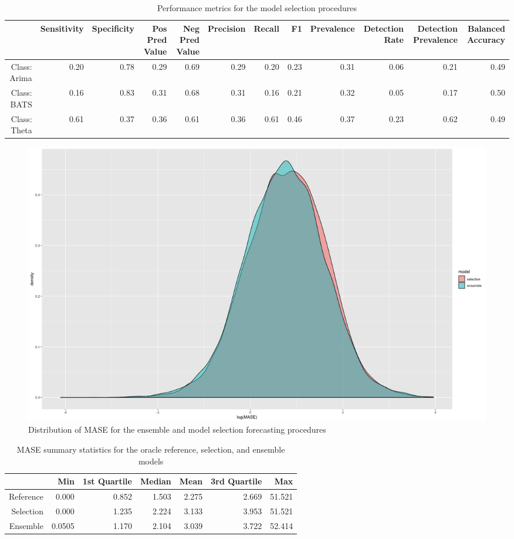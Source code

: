 \documentclass[11pt,3p,review,authoryear]{elsarticle}
\begin{document}
\begin{table}[ht]
\centering
\begin{adjustbox}{width=1\textwidth}
\begin{tabular}{rrrrrrrrrrrr}
  \hline
 & Sensitivity & Specificity & Pos Pred Value & Neg Pred Value & Precision & Recall & F1 & Prevalence & Detection Rate & Detection Prevalence & Balanced Accuracy \\ 
  \hline
Class: Arima & 0.20 & 0.78 & 0.29 & 0.69 & 0.29 & 0.20 & 0.23 & 0.31 & 0.06 & 0.21 & 0.49 \\ 
  Class: BATS & 0.16 & 0.83 & 0.31 & 0.68 & 0.31 & 0.16 & 0.21 & 0.32 & 0.05 & 0.17 & 0.50 \\ 
  Class: Theta & 0.61 & 0.37 & 0.36 & 0.61 & 0.36 & 0.61 & 0.46 & 0.37 & 0.23 & 0.62 & 0.49 \\ 
   \hline
\end{tabular}
\end{adjustbox}
\caption{Performance metrics for the model selection procedures}\label{tab:a}
\end{table}

\begin{figure}[h]
\centering
\includegraphics[width=1.0\textwidth]{distribution}
\caption{Distribution of MASE for the ensemble and model selection forecasting procedures}\label{fig:a}
\end{figure}

\begin{table}[ht]
\centering
{}
\begin{tabular}{rrrrrrr}
\hline
& Min & 1st Quartile & Median & Mean & 3rd Quartile & Max\\
\hline
Reference \vline & 0.000 & 0.852 & 1.503 & 2.275 & 2.669 & 51.521\\
Selection \vline & 0.000 & 1.235 & 2.224 & 3.133 & 3.953 & 51.521 \\
Ensemble \vline & 0.0505 & 1.170 & 2.104 & 3.039 & 3.722 & 52.414\\
\hline
\end{tabular}
\caption{MASE summary statistics for the oracle reference, selection, and ensemble models}\label{tab:c}
\end{table}
\end{document}
